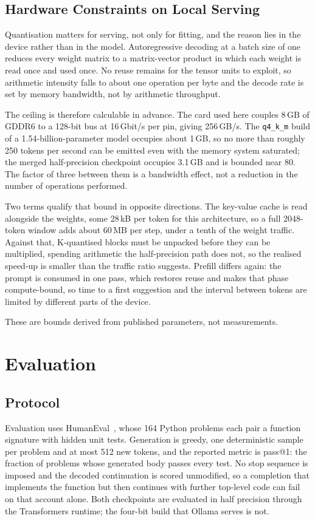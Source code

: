\documentclass[10pt,conference,a4paper]{IEEEtran}
\begin{document}
\subsection{Hardware Constraints on Local Serving}
\label{sec:hw}
Quantisation matters for serving, not only for fitting, and the reason lies
in the device rather than in the model. Autoregressive decoding at a batch
size of one reduces every weight matrix to a matrix-vector product in which
each weight is read once and used once. No reuse remains for the tensor units
to exploit, so arithmetic intensity falls to about one operation per byte and
the decode rate is set by memory bandwidth, not by arithmetic throughput.

The ceiling is therefore calculable in advance. The card used here couples
8\,GB of GDDR6 to a 128-bit bus at 16\,Gbit/s per pin, giving 256\,GB/s. The
\texttt{q4\_k\_m} build of a 1.54-billion-parameter model occupies about
1\,GB, so no more than roughly 250 tokens per second can be emitted even with
the memory system saturated; the merged half-precision checkpoint occupies
3.1\,GB and is bounded near 80. The factor of three between them is a
bandwidth effect, not a reduction in the number of operations performed.

Two terms qualify that bound in opposite directions. The key-value cache is
read alongside the weights, some 28\,kB per token for this architecture, so a
full 2048-token window adds about 60\,MB per step, under a tenth of the
weight traffic. Against that, K-quantised blocks must be unpacked before they
can be multiplied, spending arithmetic the half-precision path does not, so
the realised speed-up is smaller than the traffic ratio suggests. Prefill
differs again: the prompt is consumed in one pass, which restores reuse and
makes that phase compute-bound, so time to a first suggestion and the
interval between tokens are limited by different parts of the device.

These are bounds derived from published parameters, not measurements.

\section{Evaluation}
\subsection{Protocol}
Evaluation uses HumanEval~\cite{chen2021humaneval}, whose 164 Python problems
each pair a function signature with hidden unit tests. Generation is greedy,
one deterministic sample per problem and at most 512 new tokens, and the
reported metric is pass@1: the fraction of problems whose generated body
passes every test. No stop sequence is imposed and the decoded continuation
is scored unmodified, so a completion that implements the function but then
continues with further top-level code can fail on that account alone. Both
checkpoints are evaluated in half precision through the Transformers runtime;
the four-bit build that Ollama serves is not.
\end{document}
